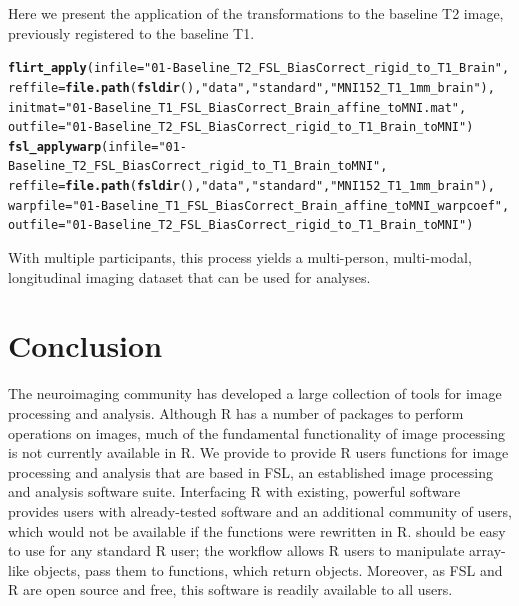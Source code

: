\documentclass[a4paper]{report}\usepackage[]{graphicx}\usepackage[]{color}
\makeatletter
\newcommand{\hlstr}[1]{\textcolor[rgb]{0.192,0.494,0.8}{#1}}%
\newcommand{\hlstd}[1]{\textcolor[rgb]{0.345,0.345,0.345}{#1}}%
\newcommand{\hlkwc}[1]{\textcolor[rgb]{0.333,0.667,0.333}{#1}}%
\newcommand{\hlkwd}[1]{\textcolor[rgb]{0.737,0.353,0.396}{\textbf{#1}}}%
\newenvironment{kframe}{%
 \def\at@end@of@kframe{}%
 \ifinner\ifhmode%
  \def\at@end@of@kframe{\end{minipage}}%
  \begin{minipage}{\columnwidth}%
 \fi\fi%
 \def\FrameCommand##1{\hskip\@totalleftmargin \hskip-\fboxsep
 \colorbox{shadecolor}{##1}\hskip-\fboxsep
     \hskip-\linewidth \hskip-\@totalleftmargin \hskip\columnwidth}%
 \MakeFramed {\advance\hsize-\width
   \@totalleftmargin\z@ \linewidth\hsize
   \@setminipage}}%
 {\par\unskip\endMakeFramed%
 \at@end@of@kframe}
\newenvironment{knitrout}{}{} %
\let\pkg=\strong
\DeclareRobustCommand\code{\bgroup\@noligs\@codex}
\makeatother
\begin{document}
\begin{article}
Here we present the application of the transformations to the baseline T2 image, previously registered to the baseline T1.  

\begin{knitrout}
\color{fgcolor}\begin{kframe}
\begin{alltt}
\hlkwd{flirt_apply}\hlstd{(}\hlkwc{infile} \hlstd{=} \hlstr{"01-Baseline_T2_FSL_BiasCorrect_rigid_to_T1_Brain"}\hlstd{,}
            \hlkwc{reffile} \hlstd{=} \hlkwd{file.path}\hlstd{(}\hlkwd{fsldir}\hlstd{(),} \hlstr{"data"}\hlstd{,} \hlstr{"standard"}\hlstd{,} \hlstr{"MNI152_T1_1mm_brain"}\hlstd{),}
            \hlkwc{initmat} \hlstd{=} \hlstr{"01-Baseline_T1_FSL_BiasCorrect_Brain_affine_toMNI.mat"}\hlstd{,}
            \hlkwc{outfile} \hlstd{=} \hlstr{"01-Baseline_T2_FSL_BiasCorrect_rigid_to_T1_Brain_toMNI"}\hlstd{)}
\hlkwd{fsl_applywarp}\hlstd{(}\hlkwc{infile} \hlstd{=} \hlstr{"01-Baseline_T2_FSL_BiasCorrect_rigid_to_T1_Brain_toMNI"}\hlstd{,}
              \hlkwc{reffile} \hlstd{=} \hlkwd{file.path}\hlstd{(}\hlkwd{fsldir}\hlstd{(),} \hlstr{"data"}\hlstd{,} \hlstr{"standard"}\hlstd{,} \hlstr{"MNI152_T1_1mm_brain"}\hlstd{),}
              \hlkwc{warpfile} \hlstd{=} \hlstr{"01-Baseline_T1_FSL_BiasCorrect_Brain_affine_toMNI_warpcoef"}\hlstd{,}
              \hlkwc{outfile} \hlstd{=} \hlstr{"01-Baseline_T2_FSL_BiasCorrect_rigid_to_T1_Brain_toMNI"}\hlstd{)}
\end{alltt}
\end{kframe}
\end{knitrout}

With multiple participants, this process yields a multi-person, multi-modal, longitudinal imaging dataset that can be used for analyses.





\section{Conclusion}
The neuroimaging community has developed a large collection of tools for image processing and analysis.  Although R has a number of packages to perform operations on images, much of the fundamental functionality of image processing is not currently available in R.  We provide \pkg{fslr} to provide R users functions for image processing and analysis that are based in FSL, an established image processing and analysis software suite.  Interfacing R with existing, powerful software provides users with already-tested software and an additional community of users, which would not be available if the functions were rewritten in R.  \pkg{fslr} should be easy to use for any standard R user; the workflow allows R users to manipulate array-like \code{nifti} objects, pass them to \pkg{fslr} functions, which return \code{nifti} objects.  Moreover, as FSL and R are open source and free, this software is readily available to all users.  


\end{article}
\end{document}
